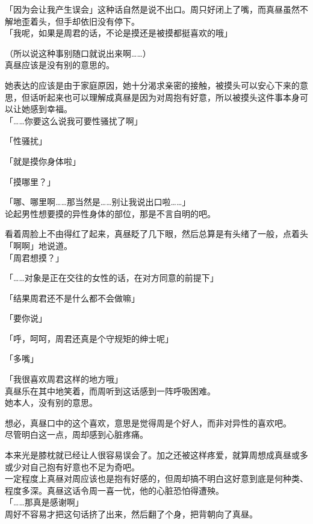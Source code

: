 「因为会让我产生误会」这种话自然是说不出口。周只好闭上了嘴，而真昼虽然不解地歪着头，但手却依旧没有停下。\\

「我呢，如果是周君的话，不论是摸还是被摸都挺喜欢的哦」

（所以说这种事别随口就说出来啊……）\\

真昼应该是没有别的意思的。

她表达的应该是由于家庭原因，她十分渴求亲密的接触，被摸头可以安心下来的意思，但话听起来也可以理解成真昼是因为对周抱有好意，所以被摸头这件事本身可以让她感到幸福。\\

「……你要这么说我可要性骚扰了啊」

「性骚扰」

「就是摸你身体啦」

「摸哪里？」

「哪、哪里啊……那当然是……别让我说出口啦……」\\

论起男性想要摸的异性身体的部位，那是不言自明的吧。

看着周脸上不由得红了起来，真昼眨了几下眼，然后总算是有头绪了一般，点着头「啊啊」地说道。\\

「周君想摸？」

「……对象是正在交往的女性的话，在对方同意的前提下」

「结果周君还不是什么都不会做嘛」

「要你说」

「呼，呵呵，周君还真是个守规矩的绅士呢」

「多嘴」

「我很喜欢周君这样的地方哦」\\

真昼乐在其中地笑着，而周听到这话感到一阵呼吸困难。\\

她本人，没有别的意思。

想必，真昼口中的这个喜欢，意思是觉得周是个好人，而非对异性的喜欢吧。\\

尽管明白这一点，周却感到心脏疼痛。

本来光是膝枕就已经让人很容易误会了。加之还被这样疼爱，就算周想成真昼或多或少对自己抱有好意也不足为奇吧。\\

一定程度上真昼对周应该也是抱有好感的，但周却搞不明白这好意到底是何种类、程度多深。真昼这话令周一喜一忧，他的心脏恐怕得遭殃。\\

「……那真是感谢啊」\\

周好不容易才把这句话挤了出来，然后翻了个身，把背朝向了真昼。
